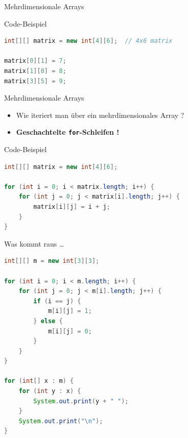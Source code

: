 \documentclass[18pt]{beamer}
\begin{document}
\begin{frame}[fragile]{Mehrdimensionale Arrays}
    \begin{exampleblock}{Code-Beispiel}
        \begin{lstlisting}[language=Java]
int[][] matrix = new int[4][6];  // 4x6 matrix

matrix[0][1] = 7;
matrix[1][0] = 8;
matrix[3][5] = 9;
        \end{lstlisting}

    \end{exampleblock}

\end{frame}

\begin{frame}[fragile]{Mehrdimensionale Arrays}
    \begin{itemize}
        \item Wie iteriert man über ein mehrdimensionales Array ?
        \pause
        \item \textbf{Geschachtelte \texttt{for}-Schleifen !}
    \end{itemize}


    \begin{exampleblock}{Code-Beispiel}
        \begin{lstlisting}[language=Java]
int[][] matrix = new int[4][6];

for (int i = 0; i < matrix.length; i++) {
    for (int j = 0; j < matrix[i].length; j++) {
        matrix[i][j] = i + j;
    }
}
        \end{lstlisting}

    \end{exampleblock}

\end{frame}

\begin{frame}[fragile]{Was kommt raus \dots}
    \begin{lstlisting}[language=Java,basicstyle=\scriptsize]
int[][] m = new int[3][3];

for (int i = 0; i < m.length; i++) {
    for (int j = 0; j < m[i].length; j++) {
        if (i == j) {
            m[i][j] = 1;
        } else {
            m[i][j] = 0;
        }
    }
}

for (int[] x : m) {
    for (int y : x) {
        System.out.print(y + " ");
    }
    System.out.print("\n");
}
    \end{lstlisting}

\end{frame}
\end{document}
